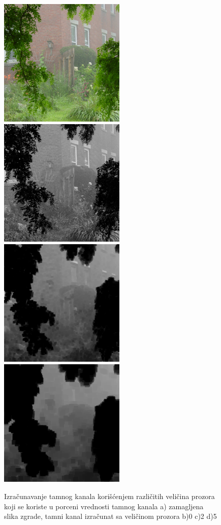 \documentclass[a4paper,12pt,titlepage]{article}
\begin{document}
\begin{figure}[ht!]
\centering
\includegraphics[width=60mm]{img/haze.png}
\includegraphics[width=60mm]{img/hazeDC0.png}
\includegraphics[width=60mm]{img/hazeDC2.png}
\includegraphics[width=60mm]{img/hazeDC5.png}
\caption{Izračunavanje tamnog kanala korišćenjem različitih veličina prozora koji se koriste u porceni vrednosti tamnog kanala a) zamagljena slika zgrade, tamni kanal izračunat sa veličinom prozora b)0 c)2 d)5}
\label{TamniKanal}
\end{figure}   
\end{document}
